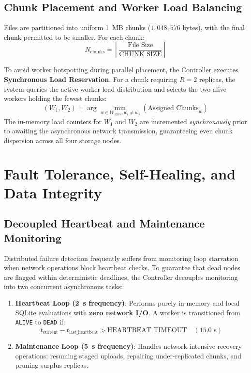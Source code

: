 \documentclass[11pt,a4paper]{article}
\begin{document}
\subsection{Chunk Placement and Worker Load Balancing}
Files are partitioned into uniform 1~MB chunks ($1,048,576$ bytes), with the final chunk permitted to be smaller. For each chunk:
\begin{equation}
    N_{\text{chunks}} = \left\lceil \frac{\text{File Size}}{\text{CHUNK\_SIZE}} \right\rceil
\end{equation}

To avoid worker hotspotting during parallel placement, the Controller executes \textbf{Synchronous Load Reservation}. For a chunk requiring $R=2$ replicas, the system queries the active worker load distribution and selects the two alive workers holding the fewest chunks:
\begin{equation}
    (W_1, W_2) = \arg\min_{w \in \mathcal{W}_{\text{alive}}, w_i \neq w_j} (\text{Assigned Chunks}_w)
\end{equation}
The in-memory load counters for $W_1$ and $W_2$ are incremented \textit{synchronously} prior to awaiting the asynchronous network transmission, guaranteeing even chunk dispersion across all four storage nodes.

\section{Fault Tolerance, Self-Healing, and Data Integrity}
\label{sec:reliability}

\subsection{Decoupled Heartbeat and Maintenance Monitoring}
Distributed failure detection frequently suffers from monitoring loop starvation when network operations block heartbeat checks. To guarantee that dead nodes are flagged within deterministic deadlines, the Controller decouples monitoring into two concurrent asynchronous tasks:
\begin{enumerate}
    \item \textbf{Heartbeat Loop (2~s frequency)}: Performs purely in-memory and local SQLite evaluations with \textbf{zero network I/O}. A worker is transitioned from \texttt{ALIVE} to \texttt{DEAD} if:
    \begin{equation}
        t_{\text{current}} - t_{\text{last\_heartbeat}} > \text{HEARTBEAT\_TIMEOUT} \quad (15.0\text{ s})
    \end{equation}
    \item \textbf{Maintenance Loop (5~s frequency)}: Handles network-intensive recovery operations: resuming staged uploads, repairing under-replicated chunks, and pruning surplus replicas.
\end{enumerate}
\end{document}
